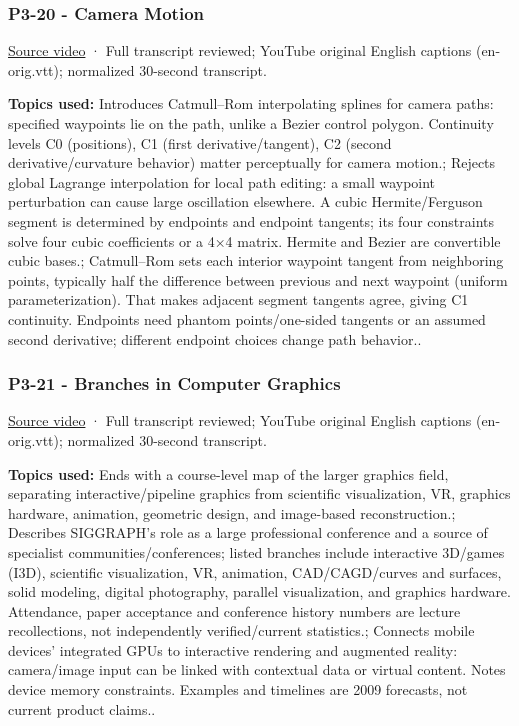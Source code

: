\subsubsection{P3-20 - Camera Motion}\label{04-visual-computing-ii-ch036-p3-20---camera-motion}

\href{https://www.youtube.com/watch?v=HAJv25Afsz8}{Source video} · Full transcript reviewed; YouTube original English captions (en-orig.vtt); normalized 30-second transcript.

\textbf{Topics used:} Introduces Catmull--Rom interpolating splines for camera paths: specified waypoints lie on the path, unlike a Bezier control polygon. Continuity levels C0 (positions), C1 (first derivative/tangent), C2 (second derivative/curvature behavior) matter perceptually for camera motion.; Rejects global Lagrange interpolation for local path editing: a small waypoint perturbation can cause large oscillation elsewhere. A cubic Hermite/Ferguson segment is determined by endpoints and endpoint tangents; its four constraints solve four cubic coefficients or a 4×4 matrix. Hermite and Bezier are convertible cubic bases.; Catmull--Rom sets each interior waypoint tangent from neighboring points, typically half the difference between previous and next waypoint (uniform parameterization). That makes adjacent segment tangents agree, giving C1 continuity. Endpoints need phantom points/one-sided tangents or an assumed second derivative; different endpoint choices change path behavior..

\subsubsection{P3-21 - Branches in Computer Graphics}\label{04-visual-computing-ii-ch036-p3-21---branches-in-computer-graphics}

\href{https://www.youtube.com/watch?v=NEIJW3ZJ1GE}{Source video} · Full transcript reviewed; YouTube original English captions (en-orig.vtt); normalized 30-second transcript.

\textbf{Topics used:} Ends with a course-level map of the larger graphics field, separating interactive/pipeline graphics from scientific visualization, VR, graphics hardware, animation, geometric design, and image-based reconstruction.; Describes SIGGRAPH's role as a large professional conference and a source of specialist communities/conferences; listed branches include interactive 3D/games (I3D), scientific visualization, VR, animation, CAD/CAGD/curves and surfaces, solid modeling, digital photography, parallel visualization, and graphics hardware. Attendance, paper acceptance and conference history numbers are lecture recollections, not independently verified/current statistics.; Connects mobile devices' integrated GPUs to interactive rendering and augmented reality: camera/image input can be linked with contextual data or virtual content. Notes device memory constraints. Examples and timelines are 2009 forecasts, not current product claims..

